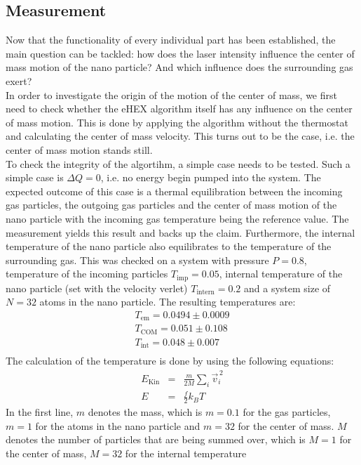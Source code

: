 \documentclass[12pt]{article}
\begin{document}
\subsection{Measurement}
Now that the functionality of every individual part has been established, the main question can be tackled: how does the laser intensity influence the
center of mass motion of the nano particle? And which influence does the surrounding gas exert?\\
In order to investigate the origin of the motion of the center of mass, we first need to check whether the eHEX algorithm itself has any influence on
the center of mass motion. This is done by applying the algorithm without the thermostat and calculating the center of mass velocity. This turns out
to be the case, i.e. the center of mass motion stands still.\\
To check the integrity of the algortihm, a simple case needs to be tested. Such a simple case is $\Delta Q = 0$, i.e. no energy begin pumped into the
system. The expected outcome of this case is a thermal equilibration between the incoming gas particles, the outgoing gas particles and the center of
mass motion of the nano particle with the incoming gas temperature being the reference value. 
The measurement yields this result and backs up the claim. Furthermore, the internal temperature of the nano particle also equilibrates to the 
temperature of the surrounding gas. This was checked on a system with pressure $P=0.8$, temperature of the incoming particles $T_\text{imp} = 0.05$, 
internal temperature of the nano particle (set with the velocity verlet) $T_\text{intern} = 0.2$ and a system size of $N=32$ atoms in the nano
particle. The resulting temperatures are:
\begin{eqnarray*}
    T_\text{em} = 0.0494 \pm 0.0009\\
    T_\text{COM} = 0.051 \pm 0.108\\
    T_\text{int} = 0.048 \pm 0.007\\
\end{eqnarray*}
The calculation of the temperature is done by using the following equations:
\begin{eqnarray}
    \label{eq:ekin}E_\text{Kin} &=& \frac{m}{2 M} \sum_i \vec{v}_i^{\, 2} \\
    \label{eq:temp}E &=& \frac{f}{2} k_B T
\end{eqnarray}
In the first line, $m$ denotes the mass, which is $m=0.1$ for the gas particles, $m=1$ for the atoms in the nano particle and $m=32$ for the center
of mass. $M$ denotes the number of particles that are being summed over, which is $M=1$ for the center of mass, $M=32$ for the internal temperature
\end{document}
